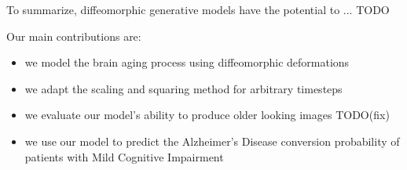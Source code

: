 To summarize, diffeomorphic generative models have the potential to ... TODO

Our main contributions are:

\begin{itemize}
	\item we model the brain aging process using diffeomorphic deformations%
	\item we adapt the scaling and squaring method for arbitrary timesteps
	\item we evaluate our model's ability to produce older looking images TODO(fix)
	\item we use our model to predict the Alzheimer's Disease conversion probability of patients with Mild Cognitive Impairment
\end{itemize}
